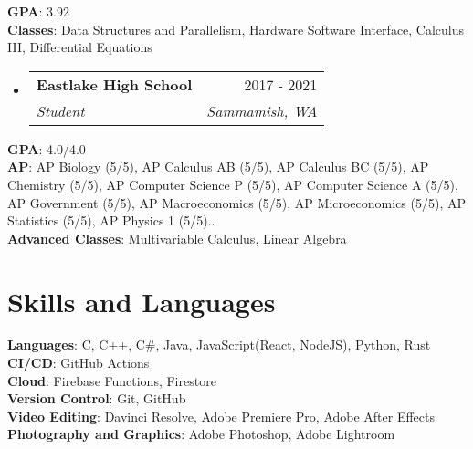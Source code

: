 \documentclass[letterpaper,10pt]{article}
\makeatletter
\newcommand{\resumeSubheading}[4]{
  \vspace{-2pt}\item
    \begin{tabular*}{0.97\textwidth}[t]{l@{\extracolsep{\fill}}r}
      \textbf{#1} & #2 \\
      \textit{\small#3} & \textit{\small #4} \\
    \end{tabular*}\vspace{-7pt}
}
\newcommand{\resumeSubHeadingListStart}{\begin{itemize}[leftmargin=0.15in, label={}]}
\newcommand{\resumeSubHeadingListEnd}{\end{itemize}}
\makeatother
\begin{document}
 \begin{itemize}[leftmargin=0.15in, label={}]
    \small{\item{
     \textbf{GPA}{: 3.92} \\
     \textbf{Classes}{: Data Structures and Parallelism, Hardware Software Interface, Calculus III, Differential Equations} \\
    }}
 \end{itemize}
  \vspace{-10pt}
  \resumeSubHeadingListStart
    \resumeSubheading
      {Eastlake High School}{2017 - 2021}
      {Student}{Sammamish, WA}
  \resumeSubHeadingListEnd

 \begin{itemize}[leftmargin=0.15in, label={}]
    \small{\item{
     \textbf{GPA}{: 4.0/4.0} \\
     \textbf{AP}{: AP Biology (5/5), AP Calculus AB (5/5), AP Calculus BC (5/5), AP Chemistry (5/5), AP Computer Science P (5/5), AP Computer Science A (5/5), AP Government (5/5), AP Macroeconomics (5/5), AP Microeconomics (5/5), AP Statistics (5/5), AP Physics 1 (5/5)..} \\
     \textbf{Advanced Classes}{: Multivariable Calculus, Linear Algebra}
    }}
 \end{itemize}


\section{Skills and Languages} 
 \begin{itemize}[leftmargin=0.15in, label={}]
    \small{\item{
    \textbf{Languages}{: C, C++, C\#, Java, JavaScript(React, NodeJS), Python, Rust} \\
     \textbf{CI/CD}{: GitHub Actions} \\
     \textbf{Cloud}{: Firebase Functions, Firestore}\\
     \textbf{Version Control}{: Git, GitHub} \\
     \textbf{Video Editing}{: Davinci Resolve, Adobe Premiere Pro, Adobe After Effects} \\
     \textbf{Photography and Graphics}{: Adobe Photoshop, Adobe Lightroom} \\
    }}
 \end{itemize}
 \vspace{-20pt}

\end{document}
